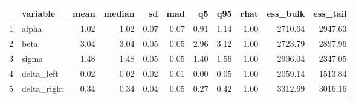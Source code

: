 \begin{table}[ht]
\centering
\begin{tabular}{rlrrrrrrrrr}
  \hline
 & variable & mean & median & sd & mad & q5 & q95 & rhat & ess\_bulk & ess\_tail \\ 
  \hline
1 & alpha & 1.02 & 1.02 & 0.07 & 0.07 & 0.91 & 1.14 & 1.00 & 2710.64 & 2947.63 \\ 
  2 & beta & 3.04 & 3.04 & 0.05 & 0.05 & 2.96 & 3.12 & 1.00 & 2723.79 & 2897.96 \\ 
  3 & sigma & 1.48 & 1.48 & 0.05 & 0.05 & 1.40 & 1.56 & 1.00 & 2906.04 & 2347.05 \\ 
  4 & delta\_left & 0.02 & 0.02 & 0.02 & 0.01 & 0.00 & 0.05 & 1.00 & 2059.14 & 1513.84 \\ 
  5 & delta\_right & 0.34 & 0.34 & 0.04 & 0.05 & 0.27 & 0.42 & 1.00 & 3312.69 & 3016.16 \\ 
   \hline
\end{tabular}
\end{table}
